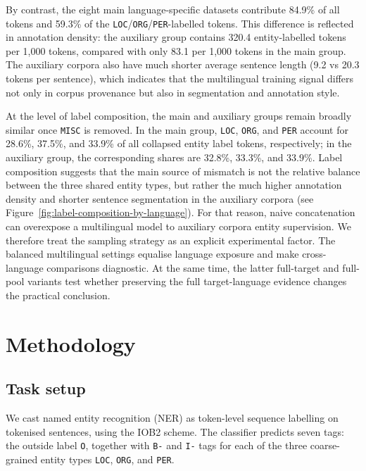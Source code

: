 \documentclass{article}
\begin{document}
By contrast, the eight main language-specific datasets contribute 84.9\% of all tokens and 59.3\% of the \texttt{LOC}/\texttt{ORG}/\texttt{PER}-labelled tokens.
This difference is reflected in annotation density: the auxiliary group contains 320.4 entity-labelled tokens per 1{,}000 tokens, compared with only 83.1 per 1{,}000 tokens in the main group.
The auxiliary corpora also have much shorter average sentence length (9.2 vs 20.3 tokens per sentence), which indicates that the multilingual training signal differs not only in corpus provenance but also in segmentation and annotation style.

At the level of label composition, the main and auxiliary groups remain broadly similar once \texttt{MISC} is removed.
In the main group, \texttt{LOC}, \texttt{ORG}, and \texttt{PER} account for 28.6\%, 37.5\%, and 33.9\% of all collapsed entity label tokens, respectively; in the auxiliary group, the corresponding shares are 32.8\%, 33.3\%, and 33.9\%.
Label composition suggests that the main source of mismatch is not the relative balance between the three shared entity types, but rather the much higher annotation density and shorter sentence segmentation in the auxiliary corpora (see Figure~\ref{fig:label-composition-by-language}). 
For that reason, naive concatenation can overexpose a multilingual model to auxiliary corpora entity supervision. 
We therefore treat the sampling strategy as an explicit experimental factor. 
The balanced multilingual settings equalise language exposure and make cross-language comparisons diagnostic. At the same time, the latter full-target and full-pool variants test whether preserving the full target-language evidence changes the practical conclusion.


\section{Methodology}
\label{sec:method}

\subsection{Task setup}
We cast named entity recognition (NER) as token-level sequence labelling on tokenised sentences, using the IOB2 scheme.
The classifier predicts seven tags: the outside label \texttt{O}, together with \texttt{B-} and \texttt{I-} tags for each of the three coarse-grained entity types \texttt{LOC}, \texttt{ORG}, and \texttt{PER}.
\end{document}
